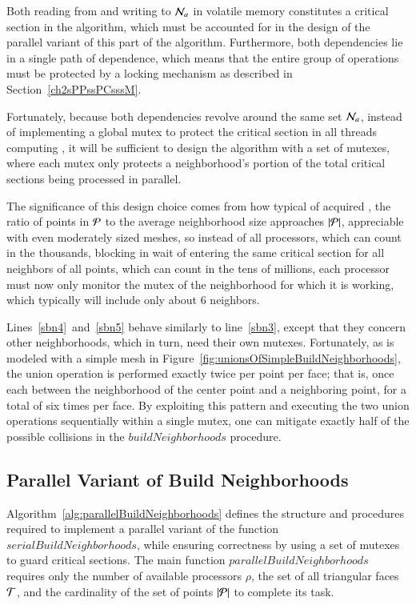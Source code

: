 Both reading from and writing to $\mathcal{N}_a$ in volatile memory constitutes a critical section in the algorithm, which must be accounted for in the design of the parallel variant of this part of the algorithm. Furthermore, both dependencies lie in a single path of dependence, which means that the entire group of operations must be protected by a locking mechanism as described in Section~\ref{ch2sPPssPCsssM}.

Fortunately, because both dependencies revolve around the same set $\mathcal{N}_a$, instead of implementing a global \gls{mutex} to protect the critical section in all threads computing , it will be sufficient to design the algorithm with a set of mutexes, where each mutex only protects a neighborhood's portion of the total critical sections being processed in parallel.

The significance of this design choice comes from how typical of acquired \tdd{}, the ratio of points in $\mathcal{P}$ to the average neighborhood size approaches $|\mathcal{P}|$, appreciable with even moderately sized meshes, so instead of all processors, which can count in the thousands, blocking in wait of entering the same critical section for all neighbors of all points, which can count in the tens of millions, each processor must now only monitor the mutex of the neighborhood for which it is working, which typically will include only about 6 neighbors.

Lines~\ref{sbn4}~and~\ref{sbn5} behave similarly to line~\ref{sbn3}, except that they concern other neighborhoods, which in turn, need their own mutexes. Fortunately, as is modeled with a simple mesh in Figure~\ref{fig:unionsOfSimpleBuildNeighborhoods}, the union operation is performed exactly twice per point per face; that is, once each between the neighborhood of the center point and a neighboring point, for a total of six times per face. By exploiting this pattern and executing the two union operations sequentially within a single mutex, one can mitigate exactly half of the possible collisions in the $\mathit{buildNeighborhoods}$ procedure.

%
%
\subsection{Parallel Variant of Build Neighborhoods}
\label{ch5sBNPssPVBN}
Algorithm~\ref{alg:parallelBuildNeighborhoods} defines the structure and procedures required to implement a parallel variant of the function $\mathit{serialBuildNeighborhoods}$, while ensuring correctness by using a set of mutexes to guard critical sections. The main function $\mathit{parallelBuildNeighborhoods}$ requires only the number of available processors $\rho$, the set of all triangular faces $\mathcal{T}$, and the cardinality of the set of points $|\mathcal{P}|$ to complete its task. 

